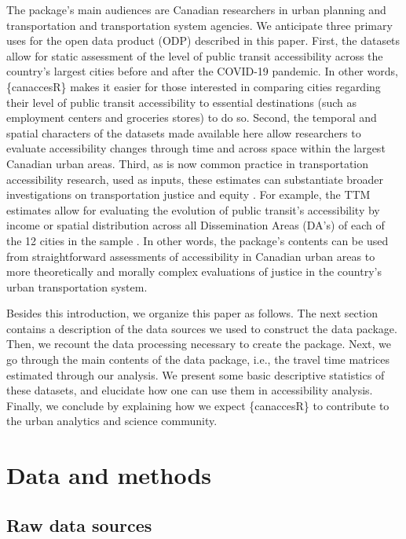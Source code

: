 \documentclass[Royal,times,sageh]{sagej}
\begin{document}
The package's main audiences are Canadian researchers in urban planning
and transportation and transportation system agencies. We anticipate
three primary uses for the open data product (ODP) described in this
paper. First, the datasets allow for static assessment of the level of
public transit accessibility across the country's largest cities before
and after the COVID-19 pandemic. In other words, \{canaccesR\} makes it
easier for those interested in comparing cities regarding their level of
public transit accessibility to essential destinations (such as
employment centers and groceries stores) to do so. Second, the temporal
and spatial characters of the datasets made available here allow
researchers to evaluate accessibility changes through time and across
space within the largest Canadian urban areas. Third, as is now common
practice in transportation accessibility research, used as inputs, these
estimates can substantiate broader investigations on transportation
justice and equity
\citep{higginsChangesAccessibilityEmergency2021, humbertoHowTranslateJustice2023, pereiraGeographicAccessCOVID192021}.
For example, the TTM estimates allow for evaluating the evolution of
public transit's accessibility by income or spatial distribution across
all Dissemination Areas (DA's) of each of the 12 cities in the sample
\citep{pargaDemocraticAccessOur2024}. In other words, the package's
contents can be used from straightforward assessments of accessibility
in Canadian urban areas to more theoretically and morally complex
evaluations of justice in the country's urban transportation system.

Besides this introduction, we organize this paper as follows. The next
section contains a description of the data sources we used to construct
the data package. Then, we recount the data processing necessary to
create the package. Next, we go through the main contents of the data
package, i.e., the travel time matrices estimated through our analysis.
We present some basic descriptive statistics of these datasets, and
elucidate how one can use them in accessibility analysis. Finally, we
conclude by explaining how we expect \{canaccesR\} to contribute to the
urban analytics and science community.

\section{Data and methods}\label{data-and-methods}

\subsection{Raw data sources}\label{raw-data-sources}
\end{document}
